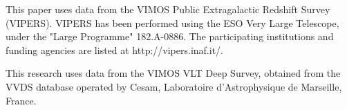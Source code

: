\documentclass[useAMS,usenatbib]{mn2e}
\begin{document}
This paper uses data from the 
VIMOS Public Extragalactic Redshift Survey (VIPERS).
VIPERS has been performed using the ESO Very Large Telescope, under the "Large
Programme" 182.A-0886. The participating institutions and funding agencies are
listed at http://vipers.inaf.it/.

This research uses data from the VIMOS VLT Deep Survey, obtained from the VVDS
database operated by Cesam, Laboratoire d'Astrophysique de Marseille, France.

\footnotesize{


}

\bsp

\label{lastpage}
\end{document}
